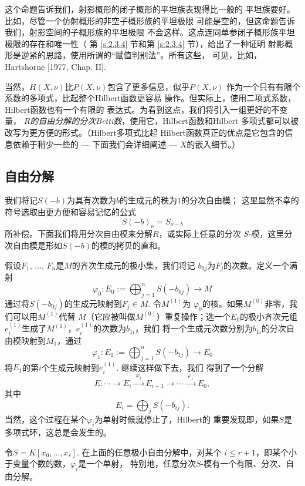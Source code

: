 这个命题告诉我们，射影概形的闭子概形的平坦族表现得比一般的
平坦族要好。比如，尽管一个仿射概形的非空子概形族的平坦极限
可能是空的，但这命题告诉我们，射影空间的子概形族的平坦极限
不会这样。这点连同单参闭子概形族平坦极限的存在和唯一性（
第 \ref{s:2.3.4} 节和第 \ref{s:2.3.4} 节），给出了一种证明
射影概形是逆紧的思路，使用所谓的“赋值判别法”。所有这些，
可见，比如，Hartshorne [1977, Chap. II].

当然，$H(X,\nu)$比$P(X,\nu)$包含了更多信息，似乎$P(X,\nu)$
作为一个只有有限个系数的多项式，比起整个Hilbert函数更容易%
操作。但实际上，使用二项式系数，Hilbert函数也有一个有限的
表达式。为看到这点，我们将引入一组更好的不变量，\textit{
$R$的自由分解的分次Betti数}，使用它，Hilbert函数和Hilbert
多项式都可以被改写为更方便的形式。（Hilbert多项式比起
Hilbert函数真正的优点是它包含的信息依赖于稍少一些的 ---
下面我们会详细阐述 --- $X$的嵌入细节。）

\subsection{自由分解}\label{s:3.3.3}

我们将记$S(-b)$为具有次数为$b$的生成元的秩为$1$的分次自由模；
这里显然不幸的符号选取由更方便和容易记忆的公式
\[
	S(-b)_\nu =S_{\nu-b}
\]
所补偿。下面我们将用分次自由模来分解$R$，或实际上任意的分次
$S$-模，这里分次自由模是形如$S(-b)$的模的拷贝的直和。

假设$F_1$, $\dots$, $F_n$是$M$的齐次生成元的极小集，我们将记
$b_{0j}$为$F_j$的次数。定义一个满射
\[
	\varphi_0:E_0:=\bigoplus_{j=1}^n S(-b_{0j})\to M
\]
通过将$S(-b_{0j})$的生成元映射到$F_j\in M$. 令$M^{(1)}$为
$\varphi_0$的核。如果$M^{(0)}$非零，我们可以用$M^{(1)}$代替
$M$（它应被叫做$M^{(0)}$）重复操作；选一个$E_0$的极小齐次元组
$e^{(1)}_i$生成了$M^{(1)}$，$e^{(1)}_i$的次数为$b_{1i}$，我们
将一个生成元次数分别为$b_{1i}$的分次自由模映射到$M_1$，通过
\[
	\varphi_1:E_1:=\bigoplus_{j=1}^n S(-b_{1j})\to E_0
\]
将$E_1$的第$i$个生成元映射到$e_i^{(1)}$. 继续这样做下去，我们
得到了一个分解
\[
	E:\cdots \longrightarrow E_i 
	\xrightarrow{\,\,\varphi_i\,\,} E_{i-1}
	\longrightarrow \cdots  \xrightarrow{\,\,\varphi_1\,\,}
	E_0,
\]
其中
\[
	E_{i}=\bigoplus_j S(-b_{ij}).
\]
当然，这个过程在某个$\varphi_i$为单射时候就停止了，Hilbert的
重要发现即，如果$S$是多项式环，这总是会发生的。


\begin{thm}[Hilbert合冲定理]
令$S=K[x_0,\dots,x_r]$. 在上面的任意极小自由分解中，对某个
$i\leq r+1$，即某个小于变量个数的数，$\varphi_i$是一个单射，
特别地，任意分次$S$-模有一个有限、分次、自由分解。
\end{thm}

